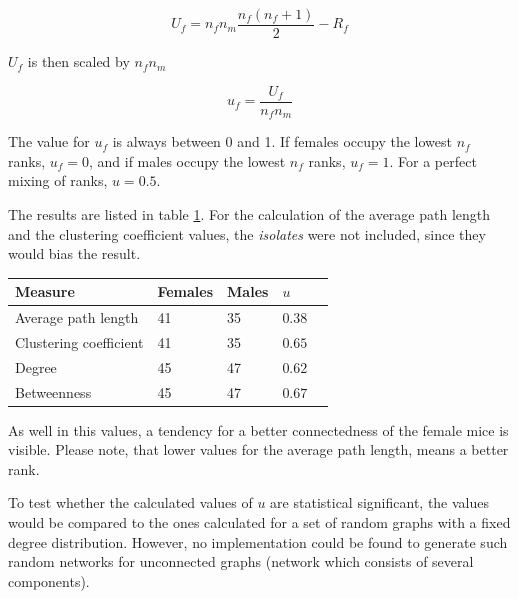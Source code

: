 \begin{equation}
U_f = n_fn_m\frac{n_f(n_f + 1)}{2} - R_f
\label{eq:mann_w}
\end{equation}  

$U_f$ is then scaled by $n_fn_m$

\begin{equation}
u_f = \frac{U_f}{n_fn_m}
\label{eq:mann_w_norm}
\end{equation}
 
The value for $u_f$ is always between 0 and 1. If females occupy the lowest $n_f$ ranks,  $u_f = 0$, and if males occupy the lowest $n_f$ ranks, $u_f=1$. For a perfect mixing of ranks, $u=0.5$.

The results are listed in table \ref{tab:u_test}. For the calculation of the average path length and the clustering coefficient values, the \textit{isolates} were not included, since they would bias the result.

\begin{table}
\begin{center} 
\renewcommand\arraystretch{1.2}
\begin{tabular}{lllll}
\toprule
\textbf{Measure} &	\textbf{Females}	& \textbf{Males}	& \textbf{$u$} \\\midrule
Average path length	&	41	&	35	& $0.38$\\
Clustering coefficient	&	41	&	35	&  $0.65$ \\
Degree	&	45 	& 	47 	& $0.62$	\\
Betweenness	&	45	&	47	&	$0.67$ \\\bottomrule

\end{tabular}
\label{tab:u_test}
\end{center}
\end{table}

As well in this values, a tendency for a better connectedness of the female mice is visible. Please note, that lower values for the average path length, means a better rank.

To test whether the calculated values of $u$ are statistical significant, the values would be compared to the ones calculated for a set of random graphs with a fixed degree distribution\citep{croft:07}\citep{newman:02a}. However, no implementation could be found to generate such random networks for unconnected graphs (network which consists of several components).

